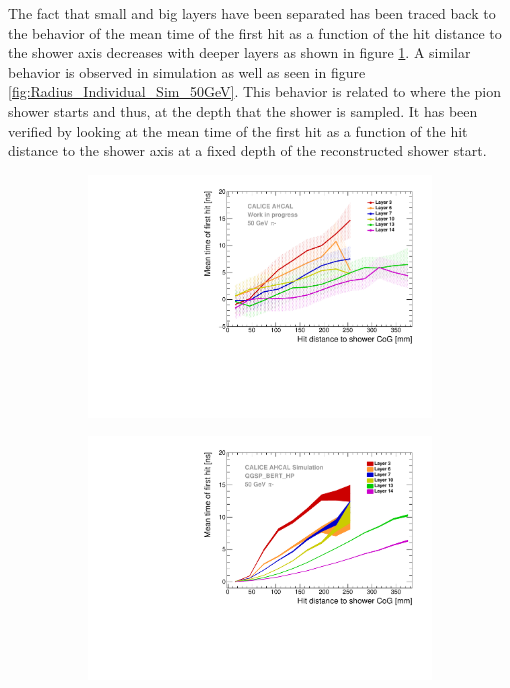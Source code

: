 \documentclass{JINST}
\begin{document}
The fact that small and big layers have been separated has been traced back to the behavior of the mean time of the first hit as a function of the hit distance to the shower axis decreases with deeper layers as shown in figure \ref{fig:Radius_Individual_Data_50GeV}. A similar behavior is observed in simulation as well as seen in figure \ref{fig:Radius_Individual_Sim_50GeV}. This behavior is related to where the pion shower starts and thus, at the depth that the shower is sampled. It has been verified by looking at the mean time of the first hit as a function of the hit distance to the shower axis at a fixed depth of the reconstructed shower start.

\begin{figure}[htbp!]
  \begin{subfigure}[t]{0.49\textwidth}
    \centering
    \includegraphics[width=1\textwidth]{fig/Timing_Radius_Comparison_ShortAsymRange_IndividualLayers.pdf}
    \caption{} \label{fig:Radius_Individual_Data_50GeV}
  \end{subfigure}
  \hfill
  \begin{subfigure}[t]{0.49\textwidth}
    \centering
    \includegraphics[width=1\textwidth]{fig/Timing_Radius_Comparison_ShortAsymRange_IndividualLayers_Sim.pdf}

\end{subfigure}
\end{figure}
\end{document}
